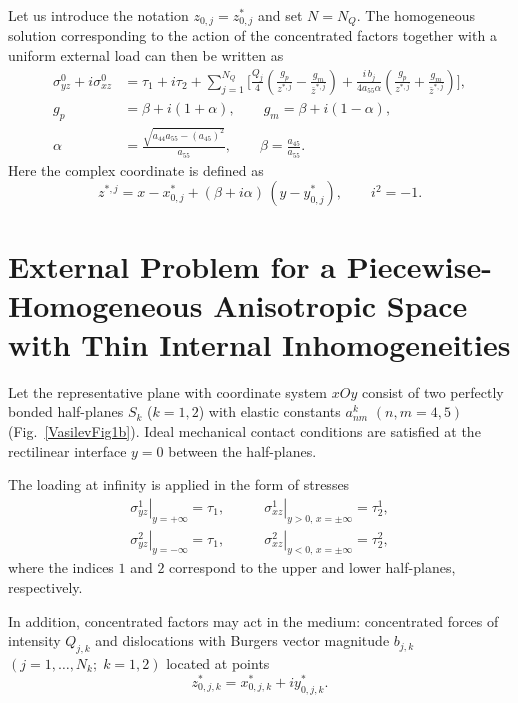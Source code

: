 Let us introduce the notation $z_{0,j}=z_{0,j}^{*}$ and set $N=N_Q$. The homogeneous solution corresponding to the action of the concentrated factors together with a uniform external load can then be written as
\begin{equation}
	\begin{aligned}
		\sigma_{yz}^{0}+i\sigma_{xz}^{0}
		&=
		\tau_1+i\tau_2
		+
		\sum_{j=1}^{N_Q}
		\Bigg[
		\frac{Q_j}{4}
		\left(
		\frac{g_p}{z^{*,j}}
		-
		\frac{g_m}{\bar{z}^{*,j}}
		\right)
		+
		\frac{i\,b_j}{4a_{55}\alpha}
		\left(
		\frac{g_p}{z^{*,j}}
		+
		\frac{g_m}{\bar{z}^{*,j}}
		\right)
		\Bigg],
		\\[2pt]
		g_p &= \beta+i(1+\alpha),
		\qquad
		g_m = \beta+i(1-\alpha),
		\\
		\alpha &=
		\frac{\sqrt{a_{44}a_{55}-(a_{45})^{2}}}{a_{55}},
		\qquad
		\beta=
		\frac{a_{45}}{a_{55}} .
	\end{aligned}
	\label{VasilevEq9}
\end{equation}
%
Here the complex coordinate is defined as
\begin{equation*}
	z^{*,j}
	=
	x-x_{0,j}^{*}
	+
	(\beta+i\alpha)\,(y-y_{0,j}^{*}),
	\qquad
	i^{2}=-1 .
\end{equation*}

\section{External Problem for a Piecewise-Homogeneous Anisotropic Space with Thin Internal Inhomogeneities}

Let the representative plane with coordinate system $xOy$ consist of two perfectly bonded half-planes $S_k$ ($k=1,2$) with elastic constants $a_{nm}^{k}$ $(n,m=4,5)$ (Fig.~\ref{VasilevFig1b}). Ideal mechanical contact conditions are satisfied at the rectilinear interface $y=0$ between the half-planes.

The loading at infinity is applied in the form of stresses
\[
\begin{array}{ll}
\left.\sigma_{yz}^{1}\right|_{y=+\infty}=\tau_1,
\qquad &
\left.\sigma_{xz}^{1}\right|_{y>0,\,x=\pm\infty}=\tau_2^{1},
\\[6pt]
\left.\sigma_{yz}^{2}\right|_{y=-\infty}=\tau_1,
\qquad &
\left.\sigma_{xz}^{2}\right|_{y<0,\,x=\pm\infty}=\tau_2^{2},
\end{array}
\]
where the indices $1$ and $2$ correspond to the upper and lower half-planes, respectively.

In addition, concentrated factors may act in the medium: concentrated forces of intensity $Q_{j,k}$ and dislocations with Burgers vector magnitude $b_{j,k}$ $(j=1,\ldots,N_k;\; k=1,2)$ located at points
\[
z_{0,j,k}^{*}=x_{0,j,k}^{*}+iy_{0,j,k}^{*}.
\]

